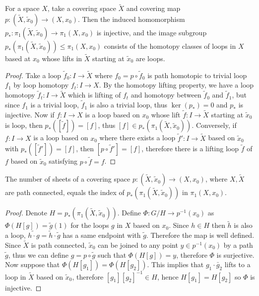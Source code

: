 \begin{prop} For a space $X$, take a covering space $\tilde{X}$ and covering map $p:(\tilde{X},\tilde{x}_0)\rightarrow (X,x_0)$. Then the induced homomorphism $p_*:\pi_1(\tilde{X},\tilde{x}_0)\rightarrow \pi_1(X,x_0)$ is injective, and the image subgroup $p_*(\pi_1(\tilde{X},\tilde{x}_0))\leq \pi_1(X,x_0)$ consists of the homotopy classes of loops in $X$ based at $x_0$ whose lifts in $\tilde{X}$ starting at $\tilde{x}_0$ are loops.
\end{prop}
\begin{proof}
Take a loop $\tilde{f}_0:I\rightarrow \tilde{X}$ where $f_0=p\circ \tilde{f}_0$ is path homotopic to trivial loop $f_1$ by loop homotopy $f_t:I\rightarrow X$. By the homotopy lifting property, we have a loop homotopy $\tilde{f}_t:I\rightarrow \tilde{X}$ which is lifting of $f_t$ and homotopy between $\tilde{f}_0$ and $\tilde{f}_1$, but since $f_1$ is a trivial loop, $\tilde{f}_1$ is also a trivial loop, thus $\ker(p_*)=0$ and $p_*$ is injective. Now if $f:I\rightarrow X$ is a loop based on $x_0$ whose lift $\tilde{f}:I\rightarrow \tilde{X}$ starting at $\tilde{x}_0$ is loop, then $p_*([\tilde{f}])=[f]$, thus $[f]\in p_*(\pi_1(\tilde{X},\tilde{x}_0))$. Conversely, if $f:I\rightarrow X$ is a loop based on $x_0$ where there exists a loop $\tilde{f}':I\rightarrow \tilde{X}$ based on $\tilde{x}_0$ with $p_*([\tilde{f}'])=[f]$, then $[p\circ \tilde{f}']=[f]$, therefore there is a lifting loop $\tilde{f}$ of $f$ based on $\tilde{x}_0$ satisfying $p\circ \tilde{f}=f$.
\end{proof}

\begin{prop} The number of sheets of a covering space $p:(\tilde{X},\tilde{x}_0)\rightarrow (X,x_0)$, where $X,\tilde{X}$ are path connected, equals the index of $p_*(\pi_1(\tilde{X},\tilde{x}_0))$ in $\pi_1(X,x_0)$.
\end{prop}
\begin{proof}
Denote $H=p_*(\pi_1(\tilde{X},\tilde{x}_0))$. Define $\Phi:G/H\rightarrow p^{-1}(x_0)$ as $\Phi(H[g])=\tilde{g}(1)$ for the loops $g$ in $X$ based on $x_0$. Since $h\in H$ then $\tilde{h}$ is also a loop, $\widetilde{h\cdot g}=\tilde{h}\cdot \tilde{g}$ has a same endpoint with $\tilde{g}$. Therefore the map is well defined. Since $\tilde{X}$ is path connected, $\tilde{x}_0$ can be joined to any point $y\in p^{-1}(x_0)$ by a path $\tilde{g}$, thus we can define $g=p\circ \tilde{g}$ such that $\Phi(H[g])=y$, therefore $\Phi$ is surjective. Now suppose that $\Phi(H[g_1])=\Phi(H[g_2])$. This implies that $g_1\cdot \bar{g}_2$ lifts to a loop in $\tilde{X}$ based on $\tilde{x}_0$, therefore $[g_1][g_2]^{-1}\in H$, hence $H[g_1]=H[g_2]$ so $\Phi$ is injective.
\end{proof}

